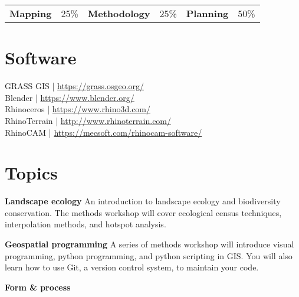 \documentclass[11pt,article,oneside]{memoir}
\begin{document}
\begin{table}[H]
\small
\begin{tabular}{l l l l l l}
\textbf{Mapping} & 25\% &
\textbf{Methodology} & 25\% &
\textbf{Planning} & 50\% \\
\end{tabular}
\end{table}

\section{Software}
GRASS GIS | \url{https://grass.osgeo.org/}\\
Blender | \url{https://www.blender.org/}\\
Rhinoceros | \url{https://www.rhino3d.com/}\\
RhinoTerrain | \url{http://www.rhinoterrain.com/}\\
RhinoCAM | \url{https://mecsoft.com/rhinocam-software/}\\

\clearpage

\section{Topics}
\normalsize

\noindent \textbf{Landscape ecology}
An introduction to landscape ecology and biodiversity conservation.
The methods workshop will cover 
ecological census techniques, interpolation methods, and
hotspot analysis. 
%
\nocite{*} \printbibliography[keyword=intro, heading=none]
\vspace*{0.5em}

\noindent \textbf{Geospatial programming}
A series of methods workshop will introduce visual programming, python programming, and python scripting in GIS. 
You will also learn how to use Git, a version control system, to maintain your code.
%
\nocite{*} \printbibliography[keyword=python, heading=none]
\vspace*{0.5em}

\noindent \textbf{Form \& process}
%
\nocite{*} \printbibliography[keyword=form_and_process, heading=none]
\vspace*{0.5em}
\end{document}
